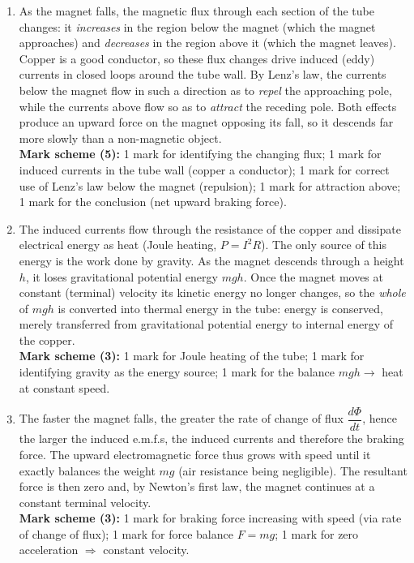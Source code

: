 \documentclass[11pt]{article}
\newcommand{\cle}[1]{{\popxbold\color{popdark}#1}}
\begin{document}
\begin{corrige}
\begin{enumerate}
\item[(a)] As the magnet falls, the magnetic flux through each section of the tube changes: it \emph{increases} in the region below the magnet (which the magnet approaches) and \emph{decreases} in the region above it (which the magnet leaves). Copper is a good conductor, so these flux changes drive induced (\cle{eddy}) currents in closed loops around the tube wall. By Lenz's law, the currents below the magnet flow in such a direction as to \emph{repel} the approaching pole, while the currents above flow so as to \emph{attract} the receding pole. Both effects produce an upward force on the magnet opposing its fall, so it descends far more slowly than a non-magnetic object.\\
\textbf{Mark scheme (5):} 1 mark for identifying the changing flux; 1 mark for induced currents in the tube wall (copper a conductor); 1 mark for correct use of Lenz's law below the magnet (repulsion); 1 mark for attraction above; 1 mark for the conclusion (net upward braking force).
\item[(b)] The induced currents flow through the resistance of the copper and dissipate electrical energy as heat (Joule heating, $P = I^2R$). The only source of this energy is the work done by gravity. As the magnet descends through a height $h$, it loses gravitational potential energy $mgh$. Once the magnet moves at constant (terminal) velocity its kinetic energy no longer changes, so the \emph{whole} of $mgh$ is converted into thermal energy in the tube: energy is conserved, merely transferred from gravitational potential energy to internal energy of the copper.\\
\textbf{Mark scheme (3):} 1 mark for Joule heating of the tube; 1 mark for identifying gravity as the energy source; 1 mark for the balance $mgh \to$ heat at constant speed.
\item[(c)] The faster the magnet falls, the greater the rate of change of flux $\dfrac{d\Phi}{dt}$, hence the larger the induced e.m.f.s, the induced currents and therefore the braking force. The upward electromagnetic force thus grows with speed until it exactly balances the weight $mg$ (air resistance being negligible). The resultant force is then zero and, by Newton's first law, the magnet continues at a constant \cle{terminal velocity}.\\
\textbf{Mark scheme (3):} 1 mark for braking force increasing with speed (via rate of change of flux); 1 mark for force balance $F = mg$; 1 mark for zero acceleration $\Rightarrow$ constant velocity.

\end{enumerate}
\end{corrige}
\end{document}
